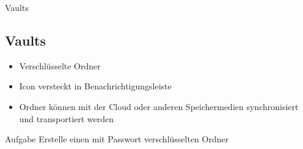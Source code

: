 \begin{frame}{Vaults}
    \subsection{Vaults}\label{subsec:vaults}
    \begin{itemize}
        \item Verschlüsselte Ordner
        \item Icon versteckt in Benachrichtigungsleiste
        \item Ordner können mit der Cloud oder anderen Speichermedien synchronisiert und
        transportiert werden
    \end{itemize}

    \vspace{0.5cm}
    \begin{alertblock}{Aufgabe}
        Erstelle einen mit Passwort verschlüsselten Ordner
    \end{alertblock}
\end{frame}